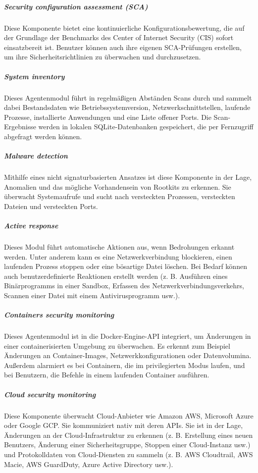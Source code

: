 \subparagraph{Security configuration assessment (SCA)}
Diese Komponente bietet eine kontinuierliche Konfigurationsbewertung, die auf der Grundlage der Benchmarks des Center of Internet Security (CIS) sofort einsatzbereit ist. Benutzer können auch ihre eigenen SCA-Prüfungen erstellen, um ihre Sicherheitsrichtlinien zu überwachen und durchzusetzen.

\subparagraph{System inventory}
Dieses Agentenmodul führt in regelmäßigen Abständen Scans durch und sammelt dabei Bestandsdaten wie Betriebssystemversion, Netzwerkschnittstellen, laufende Prozesse, installierte Anwendungen und eine Liste offener Ports. 
Die Scan-Ergebnisse werden in lokalen SQLite-Datenbanken gespeichert, die per Fernzugriff abgefragt werden können.

\subparagraph{Malware detection}
Mithilfe eines nicht signaturbasierten Ansatzes ist diese Komponente in der Lage, Anomalien und das mögliche Vorhandensein von Rootkits zu erkennen. Sie überwacht Systemaufrufe und sucht nach versteckten Prozessen, versteckten Dateien und versteckten Ports.

\subparagraph{Active response}
Dieses Modul führt automatische Aktionen aus, wenn Bedrohungen erkannt werden. Unter anderem kann es eine Netzwerkverbindung blockieren, einen laufenden Prozess stoppen oder eine bösartige Datei löschen. 
Bei Bedarf können auch benutzerdefinierte Reaktionen erstellt werden (z. B. Ausführen eines Binärprogramms in einer Sandbox, Erfassen des Netzwerkverbindungsverkehrs, Scannen einer Datei mit einem Antivirusprogramm usw.).

\subparagraph{Containers security monitoring}
Dieses Agentenmodul ist in die Docker-Engine-API integriert, um Änderungen in einer containerisierten Umgebung zu überwachen. 
Es erkennt zum Beispiel Änderungen an Container-Images, Netzwerkkonfigurationen oder Datenvolumina. 
Außerdem alarmiert es bei Containern, die im privilegierten Modus laufen, und bei Benutzern, die Befehle in einem laufenden Container ausführen.

\subparagraph{Cloud security monitoring}
Diese Komponente überwacht Cloud-Anbieter wie Amazon AWS, Microsoft Azure oder Google GCP.
Sie kommuniziert nativ mit deren APIs.
Sie ist in der Lage, Änderungen an der Cloud-Infrastruktur zu erkennen (z. B. Erstellung eines neuen Benutzers, Änderung einer Sicherheitsgruppe, Stoppen einer Cloud-Instanz usw.) und Protokolldaten von Cloud-Diensten zu sammeln (z. B. AWS Cloudtrail, AWS Macie, AWS GuardDuty, Azure Active Directory usw.).

